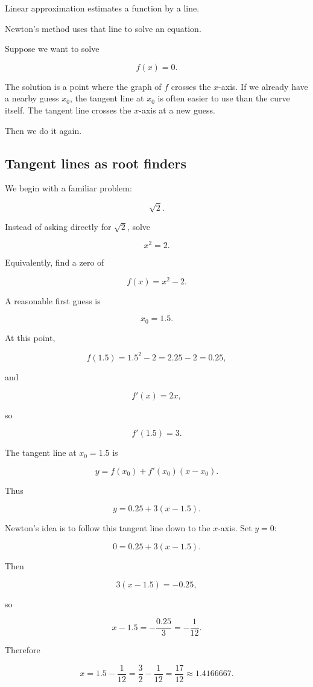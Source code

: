 Linear approximation estimates a function by a line.

Newton's method uses that line to solve an equation.

Suppose we want to solve

\[
f(x)=0.
\]

The solution is a point where the graph of \(f\) crosses the \(x\)-axis.  If we already
have a nearby guess \(x_0\), the tangent line at \(x_0\) is often easier to use than the
curve itself.  The tangent line crosses the \(x\)-axis at a new guess.

Then we do it again.

\subsection{Tangent lines as root finders}
\label{subsec:tangent-lines-root-finders}

We begin with a familiar problem:

\[
\sqrt2.
\]

Instead of asking directly for \(\sqrt2\), solve

\[
x^2=2.
\]

Equivalently, find a zero of

\[
f(x)=x^2-2.
\]

A reasonable first guess is

\[
x_0=1.5.
\]

At this point,

\[
f(1.5)=1.5^2-2=2.25-2=0.25,
\]

and

\[
f'(x)=2x,
\]

so

\[
f'(1.5)=3.
\]

The tangent line at \(x_0=1.5\) is

\[
y=f(x_0)+f'(x_0)(x-x_0).
\]

Thus

\[
y=0.25+3(x-1.5).
\]

Newton's idea is to follow this tangent line down to the \(x\)-axis.  Set \(y=0\):

\[
0=0.25+3(x-1.5).
\]

Then

\[
3(x-1.5)=-0.25,
\]

so

\[
x-1.5=-\frac{0.25}{3}=-\frac{1}{12}.
\]

Therefore

\[
x=1.5-\frac{1}{12}
=
\frac32-\frac{1}{12}
=
\frac{17}{12}
\approx1.4166667.
\]

